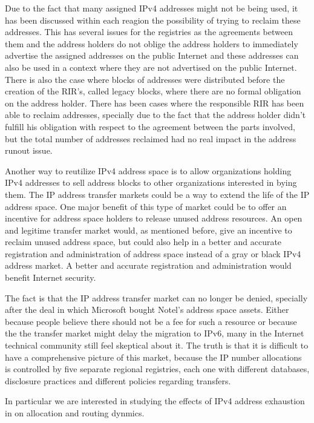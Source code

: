 \documentclass[11pt,a4paper]{scrreprt}
\begin{document}
Due to the fact that many assigned IPv4 addresses might not be being used, it has been discussed within each reagion the possibility of trying to reclaim these addresses. This has several issues for the registries as the agreements between them and the address holders do not oblige the address holders to immediately advertise the assigned addresses on the public Internet and these addresses can also be used in a context where they are not advertised on the public Internet. There is also the case where blocks of addresses were distributed before the creation of the RIR's, called legacy blocks, where there are no formal obligation on the address holder. There has been cases where the responsible RIR has been able to reclaim addresses, specially due to the fact that the address holder didn't fulfill his obligation with respect to the agreement between the parts involved, but the total number of addresses reclaimed had no real impact in the address runout issue.

Another way to reutilize IPv4 address space is to allow organizations holding IPv4 addresses to sell address blocks to other organizations interested in bying them. The IP address transfer markets could be a way to extend the life of the IP address space. One major benefit of this type of market could be to offer an incentive for address space holders to release unused address resources. An open and legitime transfer market would, as mentioned before, give an incentive to reclaim unused address space, but could also help in a better and accurate registration and administration of address space instead of a gray or black IPv4 address market. A better and accurate registration and administration would benefit Internet security.  

The fact is that the IP address transfer market can no longer be denied, specially after the deal in which Microsoft bought Notel's address space assets. Either because people believe there should not be a fee for such a resource or because the the transfer market might delay the migration to IPv6, many in the Internet technical community still feel skeptical about it. The truth is that it is difficult to have a comprehensive picture of this market, because the IP number allocations is controlled by five separate regional registries, each one with different databases, disclosure practices and different policies regarding transfers. 

In particular we are interested in studying the effects of IPv4 address exhaustion in on allocation and routing dynmics.
\end{document}
